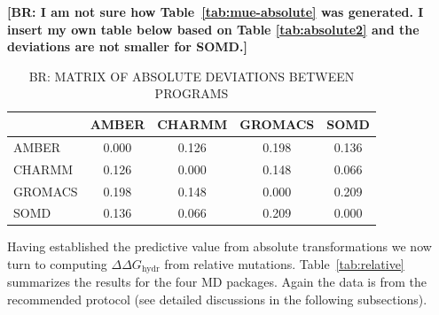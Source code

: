 \documentclass[journal=jctcce,manuscript=article]{achemso}
\begin{document}
{\footnotesize \bf \color{red} [BR: I am not sure how Table~\ref{tab:mue-absolute} was generated. I insert my own table below based on Table \ref{tab:absolute2} and the deviations are not smaller for SOMD.]}


\begin{table}[h!]
{\color{red}
    \caption{\color{red} BR: MATRIX OF ABSOLUTE DEVIATIONS BETWEEN PROGRAMS}
      \begin{tabular}{l|cccc}
        & AMBER  &  CHARMM  & GROMACS &  SOMD  \\ \hline
AMBER   & 0.000  &   0.126  &  0.198  &  0.136 \\
CHARMM  & 0.126  &   0.000  &  0.148  &  0.066 \\
GROMACS & 0.198  &   0.148  &  0.000  &  0.209 \\
SOMD    & 0.136  &   0.066  &  0.209  &  0.000 \\
      \end{tabular}
}
\end{table}

\begin{table}[]
  \begin{minipage}{\linewidth}
    \caption{Mean Absolute Deviations (MAD) (\SI{}{kcal.mol^{-1}}) between relative free energies obtained with the absolute protocol for the SOMD, GROMACS, AMBER and CHARMM packages.}\label{tab:mue-absolute}
  \end{minipage}
\end{table}

Having established the predictive value from absolute transformations we now turn to computing $\Delta\Delta G_{\mathrm{hydr}}$ from relative mutations.
Table~\ref{tab:relative} summarizes the results for the four MD packages.
Again the data is from the recommended protocol (see detailed discussions in the following subsections).
\end{document}
